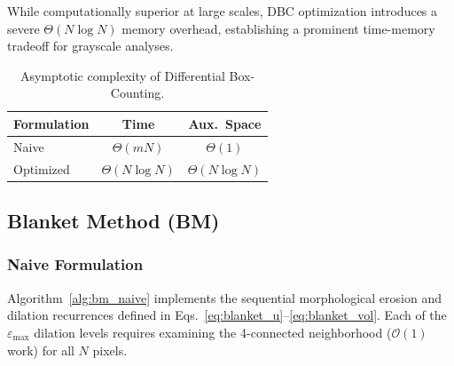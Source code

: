 While computationally superior at large scales, DBC optimization introduces a severe $\Theta(N \log N)$ memory overhead, establishing a prominent time-memory tradeoff for grayscale analyses.

\begin{table}[h]
\centering
\caption{Asymptotic complexity of Differential Box-Counting.}
\label{tab:dbc_complexity}
\begin{tabular}{lcc}
\hline
\textbf{Formulation} & \textbf{Time} & \textbf{Aux.\ Space} \\
\hline
Naive     & $\Theta(mN)$        & $\Theta(1)$        \\
Optimized & $\Theta(N \log N)$  & $\Theta(N \log N)$ \\
\hline
\end{tabular}
\end{table}

\subsection{Blanket Method (BM)}
\label{subsec:bm}

\subsubsection{Naive Formulation}

Algorithm~\ref{alg:bm_naive} implements the sequential morphological erosion and dilation recurrences defined in Eqs.~\eqref{eq:blanket_u}--\eqref{eq:blanket_vol}. Each of the $\varepsilon_{\max}$ dilation levels requires examining the 4-connected neighborhood ($\mathcal{O}(1)$ work) for all $N$ pixels. 

